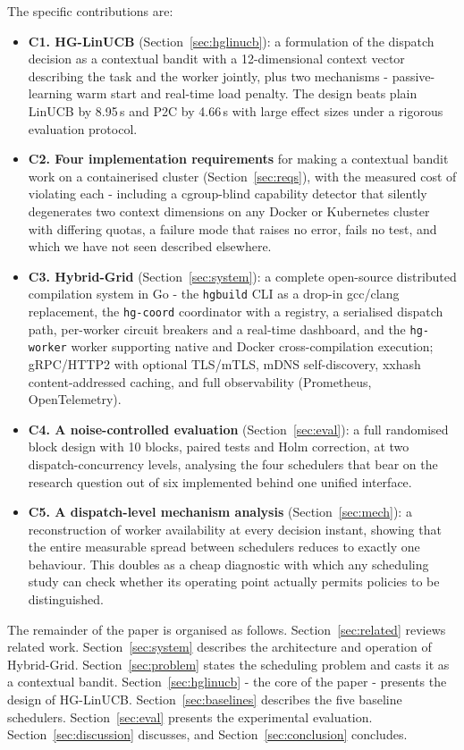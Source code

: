 \documentclass[final,5p,times,twocolumn]{elsarticle}
\begin{document}
The specific contributions are:

\begin{itemize}
\item \textbf{C1. HG-LinUCB} (Section~\ref{sec:hglinucb}): a formulation of the dispatch decision as a contextual bandit with a 12-dimensional context vector describing the task and the worker jointly, plus two mechanisms - passive-learning warm start and real-time load penalty. The design beats plain LinUCB by 8.95\,s and P2C by 4.66\,s with large effect sizes under a rigorous evaluation protocol.
\item \textbf{C2. Four implementation requirements} for making a contextual bandit work on a containerised cluster (Section~\ref{sec:reqs}), with the measured cost of violating each - including a cgroup-blind capability detector that silently degenerates two context dimensions on any Docker or Kubernetes cluster with differing quotas, a failure mode that raises no error, fails no test, and which we have not seen described elsewhere.
\item \textbf{C3. Hybrid-Grid} (Section~\ref{sec:system}): a complete open-source distributed compilation system in Go - the \texttt{hgbuild} CLI as a drop-in gcc/clang replacement, the \texttt{hg-coord} coordinator with a registry, a serialised dispatch path, per-worker circuit breakers and a real-time dashboard, and the \texttt{hg-worker} worker supporting native and Docker cross-compilation execution; gRPC/HTTP2 with optional TLS/mTLS, mDNS self-discovery, xxhash content-addressed caching, and full observability (Prometheus, OpenTelemetry).
\item \textbf{C4. A noise-controlled evaluation} (Section~\ref{sec:eval}): a full randomised block design with 10 blocks, paired tests and Holm correction, at two dispatch-concurrency levels, analysing the four schedulers that bear on the research question out of six implemented behind one unified interface.
\item \textbf{C5. A dispatch-level mechanism analysis} (Section~\ref{sec:mech}): a reconstruction of worker availability at every decision instant, showing that the entire measurable spread between schedulers reduces to exactly one behaviour. This doubles as a cheap diagnostic with which any scheduling study can check whether its operating point actually permits policies to be distinguished.
\end{itemize}

The remainder of the paper is organised as follows. Section~\ref{sec:related} reviews related work. Section~\ref{sec:system} describes the architecture and operation of Hybrid-Grid. Section~\ref{sec:problem} states the scheduling problem and casts it as a contextual bandit. Section~\ref{sec:hglinucb} - the core of the paper - presents the design of HG-LinUCB. Section~\ref{sec:baselines} describes the five baseline schedulers. Section~\ref{sec:eval} presents the experimental evaluation. Section~\ref{sec:discussion} discusses, and Section~\ref{sec:conclusion} concludes.
\end{document}
